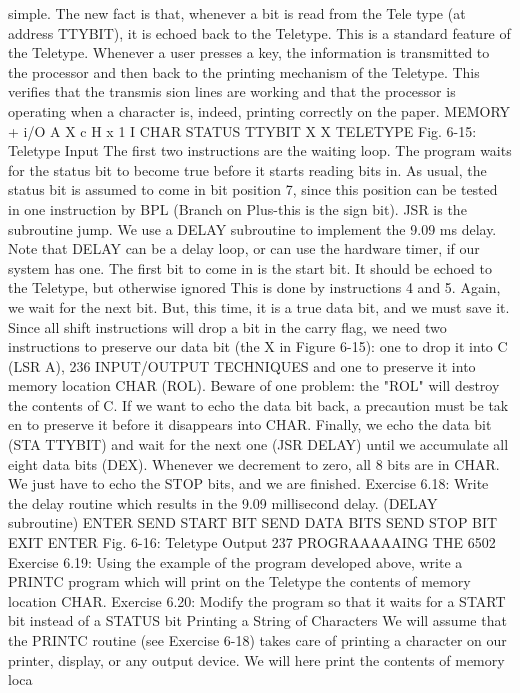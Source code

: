 \documentclass{book}
\begin{document}
simple. The new fact is that, whenever a bit is read from the Tele
type (at address TTYBIT), it is echoed back to the Teletype. This
is a standard feature of the Teletype. Whenever a user presses a key,
the information is transmitted to the processor and then back to the
printing mechanism of the Teletype. This verifies that the transmis
sion lines are working and that the processor is operating when a
character is, indeed, printing correctly on the paper.
MEMORY + i/O
A
X
c
H x 1
I CHAR
STATUS
TTYBIT
X
X
TELETYPE
Fig. 6-15: Teletype Input
The first two instructions are the waiting loop. The program waits
for the status bit to become true before it starts reading bits in.
As usual, the status bit is assumed to come in bit position 7,
since this position can be tested in one instruction by BPL (Branch
on Plus-this is the sign bit).
JSR is the subroutine jump. We use a DELAY subroutine to
implement the 9.09 ms delay. Note that DELAY can be a delay loop,
or can use the hardware timer, if our system has one.
The first bit to come in is the start bit. It should be echoed to the
Teletype, but otherwise ignored This is done by instructions 4 and 5.
Again, we wait for the next bit. But, this time, it is a true
data bit, and we must save it. Since all shift instructions will
drop a bit in the carry flag, we need two instructions to preserve
our data bit (the X in Figure 6-15): one to drop it into C (LSR A),
236
INPUT/OUTPUT TECHNIQUES
and one to preserve it into memory location CHAR (ROL).
Beware of one problem: the "ROL" will destroy the contents of
C. If we want to echo the data bit back, a precaution must be tak
en to preserve it before it disappears into CHAR. Finally, we echo
the data bit (STA TTYBIT) and wait for the next one (JSR
DELAY) until we accumulate all eight data bits (DEX).
Whenever we decrement to zero, all 8 bits are in CHAR. We
just have to echo the STOP bits, and we are finished.
Exercise 6.18: Write the delay routine which results in the 9.09
millisecond delay. (DELAY subroutine)
ENTER
SEND START
BIT
SEND DATA
BITS
SEND STOP
BIT
EXIT
ENTER
Fig. 6-16: Teletype Output
237
PROGRAAAAAING THE 6502
Exercise 6.19: Using the example of the program developed
above, write a PRINTC program which will print on the Teletype
the contents of memory location CHAR.
Exercise 6.20: Modify the program so that it waits for a START
bit instead of a STATUS bit
Printing a String of Characters
We will assume that the PRINTC routine (see Exercise 6-18)
takes care of printing a character on our printer, display, or any
output device. We will here print the contents of memory loca
\end{document}
